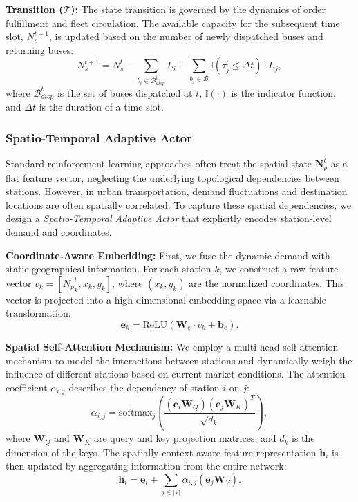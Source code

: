 \documentclass[lettersize,journal]{IEEEtran}
\begin{document}
\textbf{Transition ($\mathcal{T}$):} 
The state transition is governed by the dynamics of order fulfillment and fleet circulation. The available capacity for the subsequent time slot, $N_{s}^{t+1}$, is updated based on the number of newly dispatched buses and returning buses:
\begin{equation}
    N_{s}^{t+1} = N_{s}^t - \sum_{b_i \in \mathcal{B}^t_{disp}} L_i + \sum_{b_j \in \mathcal{B}} \mathbb{I}(\tau^t_j \le \Delta t) \cdot L_j,
\end{equation}
where $\mathcal{B}^t_{disp}$ is the set of buses dispatched at $t$, $\mathbb{I}(\cdot)$ is the indicator function, and $\Delta t$ is the duration of a time slot.

\color{blue}
\subsubsection{Spatio-Temporal Adaptive Actor}
\label{sec:actor}
Standard reinforcement learning approaches often treat the spatial state $\mathbf{N}_p^t$ as a flat feature vector, neglecting the underlying topological dependencies between stations. However, in urban transportation, demand fluctuations and destination locations are often spatially correlated. To capture these spatial dependencies, we design a \textit{Spatio-Temporal Adaptive Actor} that explicitly encodes station-level demand and coordinates.

\textbf{Coordinate-Aware Embedding:} 
First, we fuse the dynamic demand with static geographical information. For each station $k$, we construct a raw feature vector $v_k = [{N_p}^t_k, x_k, y_k]$, where $(x_k, y_k)$ are the normalized coordinates. This vector is projected into a high-dimensional embedding space via a learnable transformation:
\begin{equation}
    \mathbf{e}_k = \text{ReLU}(\mathbf{W}_e \cdot v_k + \mathbf{b}_e).
\end{equation}

\textbf{Spatial Self-Attention Mechanism:} 
We employ a multi-head self-attention mechanism to model the interactions between stations and dynamically weigh the influence of different stations based on current market conditions. The attention coefficient $\alpha_{i,j}$ describes the dependency of station $i$ on $j$:
\begin{equation}
    \alpha_{i,j} = \text{softmax}_j\left(\frac{(\mathbf{e}_i\mathbf{W}_Q)(\mathbf{e}_j\mathbf{W}_K)^T}{\sqrt{d_k}}\right),
\end{equation}
where $\mathbf{W}_Q$ and $\mathbf{W}_K$ are query and key projection matrices, and $d_k$ is the dimension of the keys. The spatially context-aware feature representation $\mathbf{h}_i$ is then updated by aggregating information from the entire network:
\begin{equation}
    \mathbf{h}_i = \mathbf{e}_i + \sum_{j \in |V|} \alpha_{i,j} (\mathbf{e}_j\mathbf{W}_V).
\end{equation}
\end{document}

